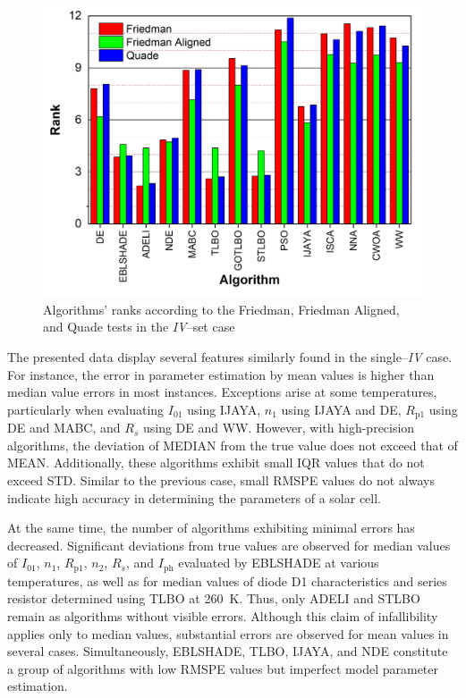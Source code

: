 \documentclass[a4paper,fleqn]{cas-sc}
\begin{document}
\begin{figure}[]
	\centering
		\includegraphics[width=0.5\columnwidth]{Fig10}
	  \caption{Algorithms' ranks according to the Friedman, Friedman Aligned, and Quade tests in the \emph{IV}--set case}\label{figRankIVset}
\end{figure}


The presented data display several features similarly found in the single--\emph{IV} case.
For instance, the error in parameter estimation by mean values is higher than median value errors in most instances.
Exceptions arise at some temperatures,
particularly when evaluating $I_{01}$ using IJAYA,
$n_1$ using IJAYA and DE,
$R_\mathrm{p1}$ using DE and MABC,
and $R_s$ using DE and WW.
However, with high-precision algorithms, the deviation of MEDIAN from
the true value does not exceed that of MEAN.
Additionally, these algorithms exhibit small IQR values that do not exceed STD.
Similar to the previous case, small RMSPE values do not always indicate high accuracy
in determining the parameters of a solar cell.


At the same time, the number of algorithms exhibiting minimal errors has decreased.
Significant deviations from true values are observed for median values
of $I_{01}$, $n_{1}$, $R_\mathrm{p1}$, $n_2$, $R_s$, and $I_\mathrm{ph}$ evaluated by EBLSHADE at various temperatures,
as well as for median values of diode D1 characteristics and series resistor determined using TLBO at 260~K.
Thus, only ADELI and STLBO remain as algorithms without visible errors.
Although this claim of infallibility applies only to median values,
substantial errors are observed for mean values in several cases.
Simultaneously, EBLSHADE, TLBO, IJAYA, and NDE constitute a group of algorithms with low RMSPE values
but imperfect model parameter estimation.
\end{document}
